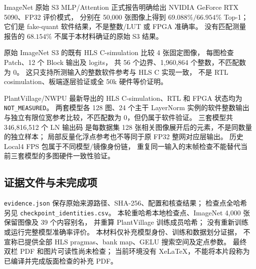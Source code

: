 ImageNet 原始 S3 MLP/Attention 正式报告明确给出
NVIDIA GeForce RTX 5090、FP32 评价模式，
分别在 50,000 张图像上得到 $69.088\%/66.954\%$ Top-1；
它们是 fake-quant 软件结果，不是整数/LUT 或 FPGA 准确率。
没有匹配测量报告的 $68.154\%$ 不属于本材料确证的原始 S3 结果。

原始 ImageNet S3 的既有 HLS C-simulation 比较 4 张固定图像，
每图检查 Patch、12 个 Block 输出及 logits，
共 56 个边界、1,960,864 个整数，不匹配数为 0。
这只支持所测输入的整数软件参考与 HLS C 实现一致，
不是 RTL cosimulation、板端逐层验证或全 50k 硬件等价证明。

PlantVillage/NWPU 最新导出的 HLS C-simulation、RTL 和 FPGA
状态均为 \texttt{NOT\_MEASURED}。
两套模型各 128 图、24 个主干 LayerNorm 实例的软件整数输出
与独立有限位宽参考比较，不匹配数为 0，但仍属于软件验证。
三套模型共 346,816,512 个 LN 输出码
是每数据集 128 张相关图像展开后的元素，不是同数量的独立样本；
局部反量化浮点参考也不等同于原 FP32 整网对应层输出。
历史 Local4 FPS 包属于不同模型/镜像身份链，
重复同一输入的末帧检查不能替代当前三套模型的多图硬件一致性验证。

\subsection{证据文件与未完成项}
\texttt{evidence.json} 保存原始来源路径、SHA-256、配置和核查结果；
检查点全哈希另见 \texttt{checkpoint\_identities.csv}。
本轮重哈希本地检查点、ImageNet 4,000 张保留图像及 39 个内容别名，
并重算 PlantVillage 训练成员哈希；
没有重新训练或运行完整模型准确率评价。
本材料仅补充模型身份、训练和数据划分证据，
不宣称已提供全部 HLS pragmas、bank map、GELU 搜索空间及定点参数。
最终双栏 PDF 和图片可读性尚未检查；
当前环境没有 XeLaTeX，不能将本片段称为已编译并完成版面检查的补充 PDF。

